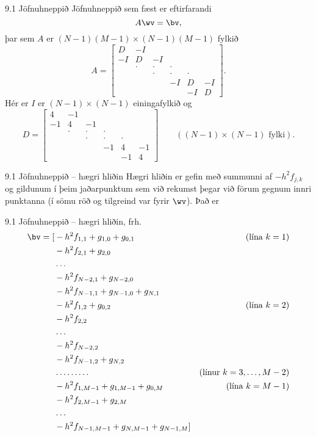 \begin{frame}{9.1 Jöfnuhneppið}
Jöfnuhneppið sem fæst er eftirfarandi
$$
A\wv = \bv,
$$ 
þar sem $A$ er $(N-1)(M-1)\times (N-1)(M-1)$ fylkið
$$
  A = \left[\begin{array}{cccccc}
D & -I &   &   &   &  \\
-I & D & -I &   &   &  \\
  & \cdot & \cdot & \cdot &   &  \\
  &   & \cdot & \cdot & \cdot &  \\
  &   &  & -I & D & -I\\
  &   &   &   & -I & D
      \end{array}\right].
$$
Hér er $I$ er $(N-1)\times (N-1)$ einingafylkið og 
$$
  D = \left[\begin{array}{cccccc}
4 & -1 &   &   &   &  \\
-1 & 4 & -1 &   &   &  \\
  & \cdot & \cdot & \cdot &   &  \\
  &   & \cdot & \cdot & \cdot &  \\
  &   &  & -1 & 4 & -1\\
  &   &   &   & -1 & 4
      \end{array}\right] \qquad ((N-1)\times (N-1) \text{ fylki}).
$$
\end{frame}

\begin{frame}{9.1 Jöfnuhneppið -- hægri hliðin}
Hægri hliðin er gefin með summunni af $-h^2 f_{j,k}$ og gildunum í þeim
jaðarpunktum sem við rekumst þegar við förum gegnum innri punktanna
(í sömu röð og tilgreind var fyrir $\wv$). \pause Það er
\end{frame}

\begin{frame}{9.1 Jöfnuhneppið -- hægri hliðin, frh.}
{}\vspace{-0.2in}
{\small \begin{align*}
  \bv = [ 
  &-h^2 f_{1,1} + g_{1,0} + g_{0,1} & (\text{lína } k=1)\\
  &-h^2 f_{2,1} + g_{2,0} \\
  &\ldots \\
  &-h^2 f_{N-2,1} + g_{N-2,0} \\
  &-h^2 f_{N-1,1} + g_{N-1,0} + g_{N,1} \\
  &-h^2 f_{1,2} + g_{0,2} & (\text{lína } k=2)\\
  &-h^2 f_{2,2} \\
  &\ldots \\
  &-h^2 f_{N-2,2}\\
  &-h^2 f_{N-1,2} + g_{N,2}\\
  & \ldots \ldots \ldots  & (\text{línur } k=3,\ldots,M-2)\\
  &-h^2 f_{1,M-1} + g_{1,M-1} + g_{0,M} & (\text{lína } k=M-1)\\
  &-h^2 f_{2,M-1} + g_{2,M} \\
  &\ldots \\
  &-h^2 f_{N-1,M-1} + g_{N,M-1} + g_{N-1,M} ]\\
  \end{align*}}
\end{frame}

